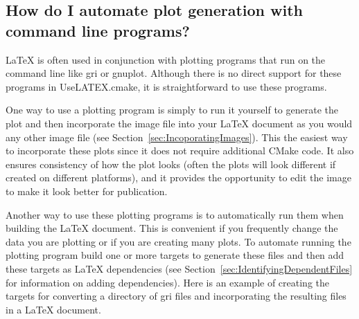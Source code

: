 \documentclass{article}
\newcommand*{\textfile}[1]{\textsf{#1}}
\newcommand*{\textprog}[1]{\textfile{#1}}
\newcommand*{\UseLATEX}{\textfile{UseLATEX.cmake}\xspace}
\newcommand*{\latex}{\LaTeX\xspace}
\begin{document}
  \subsection{How do I automate plot generation with command line programs?}
  \label{How_do_I_automate_plot_generation_with_command_line_programs}

  \latex is often used in conjunction with plotting programs that run on
  the command line like \textprog{gri} or \textprog{gnuplot}.  Although
  there is no direct support for these programs in \UseLATEX, it is
  straightforward to use these programs.

  One way to use a plotting program is simply to run it yourself to
  generate the plot and then incorporate the image file into your \latex
  document as you would any other image file (see
  Section~\ref{sec:IncoporatingImages}).  This the easiest way to
  incorporate these plots since it does not require additional CMake code.
  It also ensures consistency of how the plot looks (often the plots will
  look different if created on different platforms), and it provides the
  opportunity to edit the image to make it look better for publication.

  Another way to use these plotting programs is to automatically run them
  when building the \latex document.  This is convenient if you frequently
  change the data you are plotting or if you are creating many plots.  To
  automate running the plotting program build one or more targets to
  generate these files and then add these targets as \latex dependencies
  (see Section~\ref{sec:IdentifyingDependentFiles} for information on
  adding dependencies).  Here is an example of creating the targets for
  converting a directory of \textprog{gri} files and incorporating the
  resulting files in a \latex document.
\end{document}
